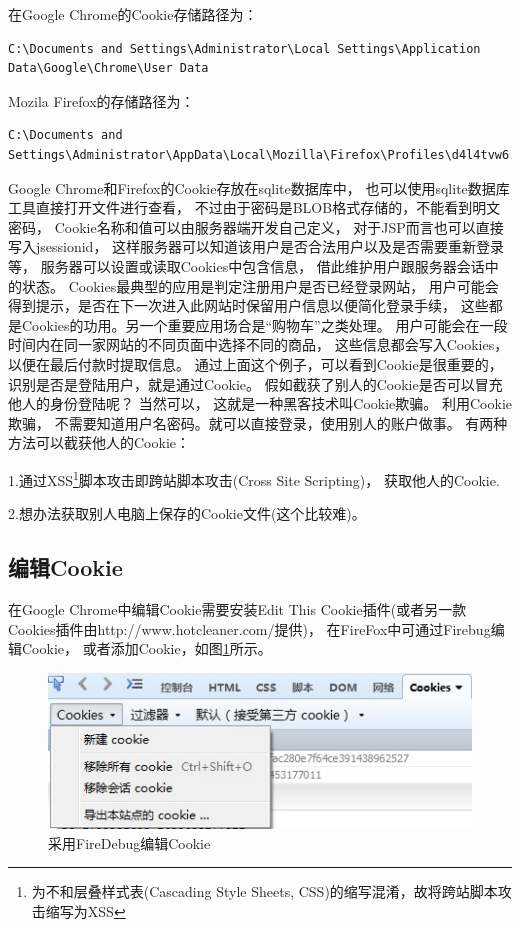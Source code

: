\documentclass{book}
\begin{document}
在Google Chrome的Cookie存储路径为：

\begin{lstlisting}
C:\Documents and Settings\Administrator\Local Settings\Application Data\Google\Chrome\User Data
\end{lstlisting}

Mozila Firefox的存储路径为：

\begin{lstlisting}
C:\Documents and Settings\Administrator\AppData\Local\Mozilla\Firefox\Profiles\d4l4tvw6.default\OfflineCache
\end{lstlisting}

Google Chrome和Firefox的Cookie存放在sqlite数据库中，
也可以使用sqlite数据库工具直接打开文件进行查看，
不过由于密码是BLOB格式存储的，不能看到明文密码，
Cookie名称和值可以由服务器端开发自己定义，
对于JSP而言也可以直接写入jsessionid，
这样服务器可以知道该用户是否合法用户以及是否需要重新登录等，
服务器可以设置或读取Cookies中包含信息，
借此维护用户跟服务器会话中的状态。
Cookies最典型的应用是判定注册用户是否已经登录网站，
用户可能会得到提示，是否在下一次进入此网站时保留用户信息以便简化登录手续，
这些都是Cookies的功用。另一个重要应用场合是“购物车”之类处理。
用户可能会在一段时间内在同一家网站的不同页面中选择不同的商品，
这些信息都会写入Cookies，以便在最后付款时提取信息。
通过上面这个例子，可以看到Cookie是很重要的，
识别是否是登陆用户，就是通过Cookie。  
假如截获了别人的Cookie是否可以冒充他人的身份登陆呢？  
当然可以， 这就是一种黑客技术叫Cookie欺骗。
利用Cookie欺骗， 不需要知道用户名密码。就可以直接登录，使用别人的账户做事。
有两种方法可以截获他人的Cookie：

1.通过XSS\footnote{为不和层叠样式表(Cascading Style Sheets,
CSS)的缩写混淆，故将跨站脚本攻击缩写为XSS}脚本攻击即跨站脚本攻击(Cross Site Scripting)，
获取他人的Cookie. 

2.想办法获取别人电脑上保存的Cookie文件(这个比较难)。

\subsection{编辑Cookie}

在Google Chrome中编辑Cookie需要安装Edit This Cookie插件(或者另一款Cookies插件由http://www.hotcleaner.com/提供)，
在FireFox中可通过Firebug编辑Cookie，
或者添加Cookie，如图\ref{fig:EditCookieUsingFireDebug}所示。

\begin{figure}[htbp]
	\centering
	\includegraphics[scale=0.8]{EditCookieUsingFireFox.jpg}
	\caption{采用FireDebug编辑Cookie}
	\label{fig:EditCookieUsingFireDebug}
\end{figure}
\end{document}
